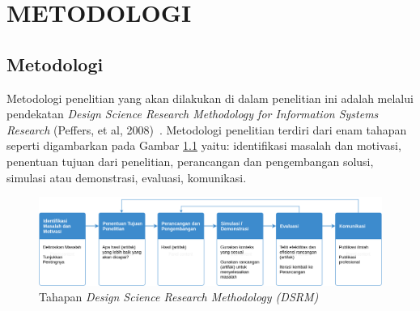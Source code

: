 \chapter{METODOLOGI}


\section{Metodologi}
Metodologi penelitian yang akan dilakukan di dalam penelitian ini adalah melalui pendekatan \textit{Design Science Research Methodology for Information Systems Research} (Peffers, et al, 2008)~\cite{peffers_design_2007}. Metodologi penelitian terdiri dari enam tahapan seperti digambarkan pada Gambar \ref{fig:dsrm} yaitu: identifikasi masalah dan motivasi, penentuan tujuan dari penelitian, perancangan dan pengembangan solusi, simulasi atau demonstrasi, evaluasi, komunikasi.

\begin{figure}[h]
    \centering
    \includegraphics[width=13cm]{../../Resources/Images/dsrm}
    \caption{Tahapan \textit{Design Science Research Methodology (DSRM)}}
    \label{fig:dsrm}
\end{figure}

